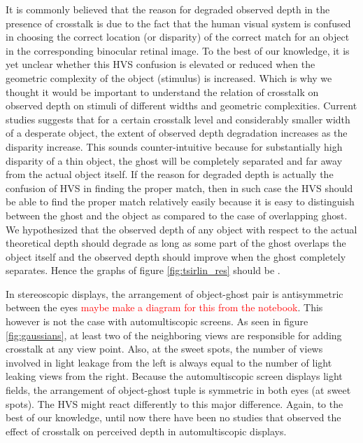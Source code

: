 It is commonly believed that the reason for degraded observed depth in the presence of crosstalk is due to the fact that the human visual system is confused in choosing the correct location (or disparity) of the correct match for an object in the corresponding binocular retinal image. To the best of our knowledge, it is yet unclear whether this HVS confusion is elevated or reduced when the geometric complexity of the object (stimulus) is increased.  Which is why we thought it would be important to understand the relation of crosstalk on observed depth on stimuli of different widths and geometric complexities. Current studies suggests that for a certain crosstalk level and considerably smaller width of a desperate object, the extent of observed depth degradation increases as the disparity increase. This sounds counter-intuitive because for substantially high disparity of a thin object, the ghost will be completely separated and far away from the actual object itself. If the reason for degraded depth is actually the confusion of HVS in finding the proper match, then in such case the HVS should be able to find the proper match relatively easily because it is easy to distinguish between the ghost and the object as compared to the case of overlapping ghost. We hypothesized that the observed depth of any object with respect to the actual theoretical depth should degrade as long as some part of the ghost overlaps the object itself and the observed depth should improve when the ghost completely separates. Hence the graphs of figure \ref{fig:tsirlin_res} should be .

In stereoscopic displays, the arrangement of object-ghost pair is antisymmetric between the eyes \textcolor{red}{maybe make a diagram for this from the notebook}. This however is not the case with automultiscopic screens. As seen in figure \ref{fig:gaussians}, at least two of the neighboring views are responsible for adding crosstalk at any view point. Also, at the sweet spots, the number of views involved in light leakage from the left is always equal to the number of light leaking views from the right. Because the automultiscopic screen displays light fields, the arrangement of object-ghost tuple is symmetric in both eyes (at sweet spots). The HVS might react differently to this major difference. Again, to the best of our knowledge, until now there have been no studies that observed the effect of crosstalk on perceived depth in automultiscopic displays.\pagebreak

